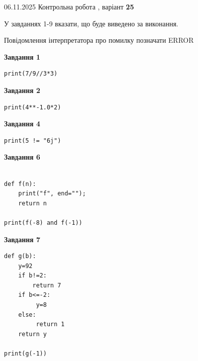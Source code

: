 \documentclass[12pt, ukrainian]{article}
\begin{document}
{\Large{06.11.2025 Контрольна робота , варіант  \No \textbf { 25 }\par}}
{
\begin {large}
У завданнях 1-9 вказати, що буде виведено за виконання.

Повідомлення інтерпретатора про помилку позначати ERROR

\begin{minipage}[t]{7.5cm}

\begin{center}
\textbf{Завдання 1}
\end{center}

\begin{verbatim}
print(7/9//3*3)
\end{verbatim}



\begin{center}
\textbf{Завдання 2}
\end{center}

\begin{verbatim}
print(4**-1.0*2)
\end{verbatim}



\begin{center}
\textbf{Завдання 4}
\end{center}

\begin{verbatim}
print(5 != "6j")
\end{verbatim}



\begin{center}
\textbf{Завдання 6}
\end{center}

\begin{verbatim}

def f(n):
    print("f", end="");
    return n

print(f(-8) and f(-1))
\end{verbatim}



\begin{center}
\textbf{Завдання 7}
\end{center}

\begin{verbatim}
def g(b):
    y=92
    if b!=2: 
        return 7
    if b<=-2:
         y=8
    else:
         return 1
    return y

print(g(-1))
\end{verbatim}


\end{minipage}
\end{large}}
\end{document}

